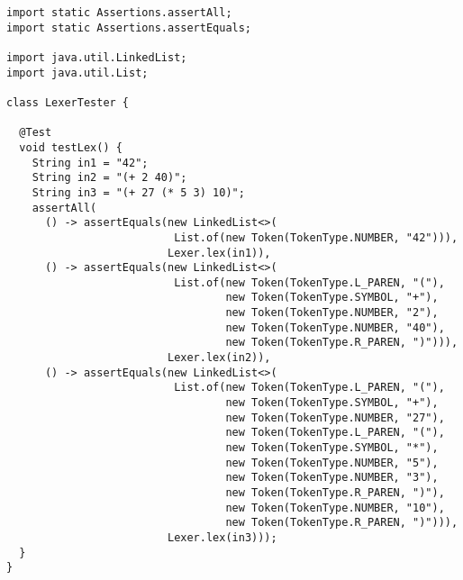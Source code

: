 \begin{lstlisting}[language=MyJava]
import static Assertions.assertAll;
import static Assertions.assertEquals;

import java.util.LinkedList;
import java.util.List;

class LexerTester {
  
  @Test
  void testLex() {
    String in1 = "42";
    String in2 = "(+ 2 40)";
    String in3 = "(+ 27 (* 5 3) 10)";
    assertAll(
      () -> assertEquals(new LinkedList<>(
                          List.of(new Token(TokenType.NUMBER, "42"))),
                         Lexer.lex(in1)),
      () -> assertEquals(new LinkedList<>(
                          List.of(new Token(TokenType.L_PAREN, "("),
                                  new Token(TokenType.SYMBOL, "+"),
                                  new Token(TokenType.NUMBER, "2"),
                                  new Token(TokenType.NUMBER, "40"),
                                  new Token(TokenType.R_PAREN, ")"))),
                         Lexer.lex(in2)),
      () -> assertEquals(new LinkedList<>(
                          List.of(new Token(TokenType.L_PAREN, "("),
                                  new Token(TokenType.SYMBOL, "+"),
                                  new Token(TokenType.NUMBER, "27"),
                                  new Token(TokenType.L_PAREN, "("),
                                  new Token(TokenType.SYMBOL, "*"),
                                  new Token(TokenType.NUMBER, "5"),
                                  new Token(TokenType.NUMBER, "3"),
                                  new Token(TokenType.R_PAREN, ")"),
                                  new Token(TokenType.NUMBER, "10"),
                                  new Token(TokenType.R_PAREN, ")"))),
                         Lexer.lex(in3)));
  }
}
\end{lstlisting}

